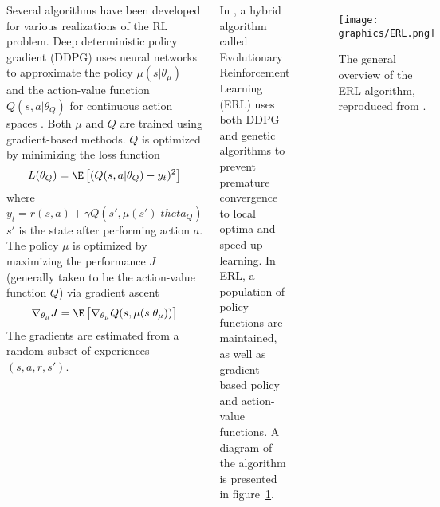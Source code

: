 \documentclass[20pt,margin=1in,innermargin=-7in,blockverticalspace=-0in]{tikzposter}
\begin{document}
\begin{columns}
{    Several algorithms have been developed for various realizations of the RL problem. Deep deterministic policy gradient (DDPG) uses neural networks to approximate the policy $\mu(s|\theta_\mu)$ and the action-value function $Q(s,a|\theta_Q)$ for continuous action spaces \cite{lillicrap2015continuous}.
    Both $\mu$ and $Q$ are trained using gradient-based methods. $Q$ is optimized by minimizing the loss function
    \begin{equation}\label{eq:critic_loss}
        L(\theta_Q) = \E\left[ (Q(s,a|\theta_Q) - y_t)^2 \right]
    \end{equation}
    where
    \[
    y_t = r(s,a) + \gamma Q(s', \mu(s')|theta_Q)
    \]
    $s'$ is the state after performing action $a$.
    The policy $\mu$ is optimized by maximizing the performance $J$ (generally taken to be the action-value function $Q$) via gradient ascent
    \begin{equation}\label{eq:actor_train}
        \nabla_{\theta_\mu} J = \E\left[
            \nabla_{\theta_\mu} Q(s,\mu(s|\theta_\mu))
        \right]
    \end{equation}
    The gradients are estimated from a random subset of experiences $(s,a,r,s')$.
    
    In \cite{khadka2018evolutionguided}, a hybrid algorithm called Evolutionary Reinforcement Learning (ERL) uses both DDPG and genetic algorithms to prevent premature convergence to local optima and speed up learning. In ERL, a population of policy functions are maintained, as well as gradient-based policy and action-value functions. A diagram of the algorithm is presented in figure~\ref{fig:ERL}.
    \begin{minipage}{\linewidth}
    \begin{figure}[H]
        \centering
        \texttt{[image: graphics/ERL.png]}
        \caption{The general overview of the ERL algorithm, reproduced from \cite{khadka2018evolutionguided}.}
        \label{fig:ERL}
    \end{figure}
    \end{minipage}
    } %
    
    

\end{columns}
\end{document}
